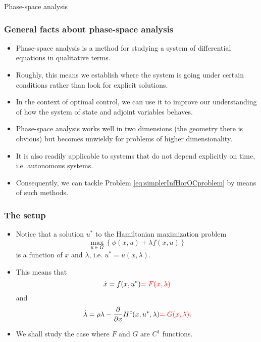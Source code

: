 \documentclass[10pt]{beamer}
\theoremstyle{definition}
\begin{document}
\begin{section}{Phase-space analysis}\label{sec:phspace}

\begin{frame}[fragile]
\frametitle{General facts about phase-space analysis}
\begin{itemize}\itemsep1em
\item Phase-space analysis is a method for studying a system of differential equations in qualitative terms. 
\item Roughly, this means we establish where the system is going under certain conditions rather than look for explicit solutions.
\item In the context of optimal control, we can use it to improve our understanding of how the system of state and adjoint variables behaves.
\item Phase-space analysis works well in two dimensions (the geometry there is obvious) but becomes unwieldy for problems of higher dimensionality.
\item It is also readily applicable to systems that do not depend explicitly on time, i.e. autonomous systems.
\item Consequently, we can tackle Problem \eqref{eq:simplerInfHorOCproblem} by means of such methods.
\end{itemize}
\end{frame}

\begin{frame}[fragile]
\frametitle{The setup}
\begin{itemize}\itemsep1em
\item Notice that a solution $ u^* $ to the Hamiltonian maximization problem 
\[ \max_{u\in \Omega} \left \{\phi (x,u)+\lambda f(x,u)\right \} \] is a function of $ x $ and $ \lambda $, i.e. $ u^*=u(x,\lambda) $.
\item This means that \[ \dot{x}=f(x,u^*)\textcolor{red}{=F(x,\lambda)} \] and \[\dot{\lambda} = \rho \lambda - \frac{\partial}{\partial x}H^c (x,u^*,\lambda) \textcolor{red}{= G(x,\lambda)}. \]
\item We shall study the case where $ F $ and $ G $ are $ C^1 $ functions.
\end{itemize}
\end{frame} 


\end{section}
\end{document}
